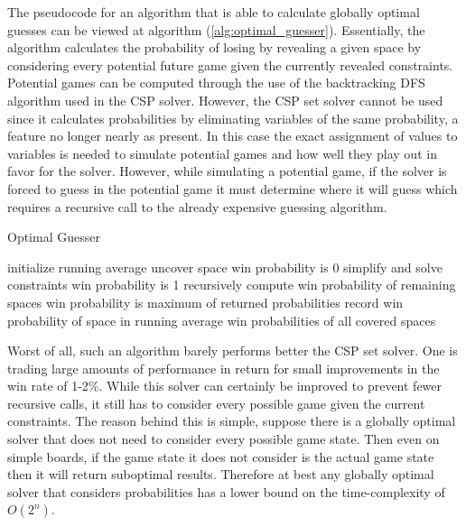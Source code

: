 \documentclass[letterpaper]{article}
\begin{document}
The pseudocode for an algorithm that is able to calculate globally optimal guesses can be viewed at algorithm (\ref{alg:optimal_guesser}).  Essentially, the algorithm calculates the probability of losing by revealing a given space by considering every potential future game given the currently revealed constraints.  Potential games can be computed through the use of the backtracking DFS algorithm used in the CSP solver.  However, the CSP set solver cannot be used since it calculates probabilities by eliminating variables of the same probability, a feature no longer nearly as present.  In this case the exact assignment of values to variables is needed to simulate potential games and how well they play out in favor for the solver.  However, while simulating a potential game, if the solver is forced to guess in the potential game it must determine where it will guess which requires a recursive call to the already expensive guessing algorithm.

\begin{algorithm}[t]
\caption{Optimal Guesser}
\label{alg:optimal_guesser}
\begin{algorithmic}[1]
\STATE initialize running average 
		\STATE uncover space
			\STATE win probability is 0
		\ELSE
			\STATE simplify and solve constraints
				\STATE win probability is 1
			\ELSE
				\STATE recursively compute win probability of remaining spaces
				\STATE win probability is maximum of returned probabilities
			\ENDIF
		\ENDIF
	\ENDFOR
	\STATE record win probability of space in running average
\ENDFOR
\RETURN win probabilities of all covered spaces
\end{algorithmic}
\end{algorithm}

Worst of all, such an algorithm barely performs better the CSP set solver.  One is trading large amounts of performance in return for small improvements in the win rate of 1-2\%.  While this solver can certainly be improved to prevent fewer recursive calls, it still has to consider every possible game given the current constraints.  The reason behind this is simple, suppose there is a globally optimal solver that does not need to consider every possible game state.  Then even on simple boards, if the game state it does not consider is the actual game state then it will return suboptimal results.  Therefore at best any globally optimal solver that considers probabilities has a lower bound on the time-complexity of $O(2^n)$.
\end{document}
